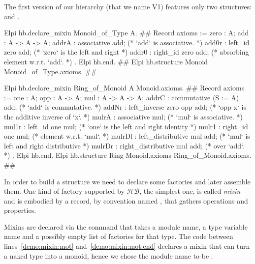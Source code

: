 \documentclass[a4paper,UKenglish,cleveref, autoref]{lipics-v2019}
\newcommand{\HB}{\ensuremath{\mathcal{HB}}}
\newcommand{\mixin}{mixin}
\newcommand{\Mixins}{Mixins}
\newcommand{\factory}{factory}
\newcommand{\factories}{factories}
\theoremstyle{implem}
\theoremstyle{implem}
\theoremstyle{axiom}
\theoremstyle{abscommand}
\theoremstyle{command}
\begin{document}
The first version of our hierarchy (that we name V1) features only two
structures:  and .
\begin{coqcode}
Elpi hb.declare_mixin Monoid_of_Type A.                       #\label{demo:mixin:mot}#
  Record axioms := {
    zero : A;
    add : A -> A -> A;
    addrA : associative add;              (* `add` is associative.                  *)
    add0r : left_id zero add;             (* `zero` is the left and right           *)
    addr0 : right_id zero add;            (*   absorbing element w.r.t. `add`.      *)
}.
Elpi hb.end.                                              #\label{demo:mixin:mot:end}#
Elpi hb.structure Monoid Monoid_of_Type.axioms.        #\label{demo:structure:monoid}#

Elpi hb.declare_mixin Ring_of_Monoid A Monoid.axioms.       #\label{demo:mixin:rom}#
  Record axioms := {
    one : A;
    opp : A -> A;
    mul : A -> A -> A;
    addrC : commutative (S := A) add;    (* `add` is commutative.                   *)
    addNr : left_inverse zero opp add;   (* `opp x` is the additive inverse of `x`. *)
    mulrA : associative mul;             (* `mul` is associative.                   *)
    mul1r : left_id one mul;             (* `one` is the left and right identity    *)
    mulr1 : right_id one mul;            (*   element w.r.t. `mul`.                 *)
    mulrDl : left_distributive mul add;  (* `mul` is left and right distributive    *)
    mulrDr : right_distributive mul add; (*   over `add`.                           *)
  }.
Elpi hb.end.
Elpi hb.structure Ring Monoid.axioms Ring_of_Monoid.axioms. #\label{demo:structure:ring}#

\end{coqcode}

In order to build a structure we need to declare some \factories{} and
later assemble them. One kind of \factory{} supported by \HB{}, the simplest
one, is called \emph{\mixin{}} and is embodied by a record, by convention named
, that gathers operations and properties.

\Mixins{} are declared via the  command
that takes a module name,
a type variable name and a possibly empty list of \factories{} for that type.
The code between lines~\ref{demo:mixin:mot}
and~\ref{demo:mixin:mot:end} declares a \mixin{} that can turn a naked
type  into a monoid, hence we chose the module name to be .
\end{document}
